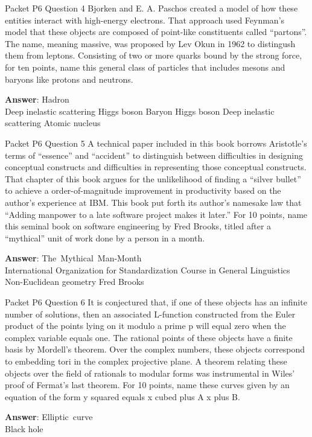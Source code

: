 \begin{frame}{Packet P6 Question 4}
Bjorken and E. A. Paschos   created a model   of how these entities interact with high-energy electrons.  That approach used Feynman's model that these objects are composed of point-like constituents called ``partons''.  The name, meaning massive, was proposed by Lev Okun in 1962 to distingush them from leptons.  Consisting of two or more quarks bound by the strong force, for ten points, name this general class of particles that includes mesons and baryons like protons and neutrons.        

\textbf{Answer}: Hadron\\
 Deep inelastic scattering
 Higgs boson
 Baryon
 Higgs boson
 Deep inelastic scattering
 Atomic nucleus
\end{frame}

\begin{frame}{Packet P6 Question 5}
A technical paper included   in this book borrows Aristotle’s terms of “essence” and “accident” to distinguish between difficulties in designing conceptual constructs and difficulties in representing those conceptual constructs. That chapter of this book argues for the unlikelihood of   finding a “silver bullet” to achieve a order-of-magnitude improvement in productivity based on the author's experience   at IBM. This book put forth its author’s namesake law that “Adding manpower to a late software project makes it later.” For 10 points, name this seminal book on software engineering by Fred Brooks, titled   after a “mythical” unit of work done by a person in a month.    

\textbf{Answer}: The\ Mythical\ Man-Month\\
 International Organization for Standardization
 Course in General Linguistics
 Non-Euclidean geometry
 Fred Brooks
\end{frame}

\begin{frame}{Packet P6 Question 6}
It is conjectured that, if one of these objects has an infinite   number of solutions, then an associated L-function constructed from the Euler product of the points lying on it modulo a prime p will equal zero when the complex variable equals one. The rational points of these objects have a finite basis by Mordell's theorem.   Over the complex numbers, these objects correspond to embedding tori in the complex projective plane. A theorem relating   these objects over the field of rationals to modular forms was instrumental   in Wiles' proof of Fermat's last theorem. For 10 points, name these curves given by an equation of the form y squared equals   x cubed plus A x plus B.

\textbf{Answer}: Elliptic\ curve\\
 Black hole
\end{frame}

